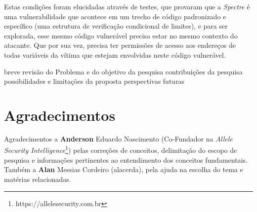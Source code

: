 \documentclass[
	article,			    %
	12pt,				    %
	oneside,			    %
	a4paper,			    %
	chapter=TITLE,		    %
	section=TITLE,		    %
	subsection=TITLE,	    %
	english,			    %
	brazil,				    %
	sumario=tradicional
]{abntex2}
\begin{document}
Estas condições foram elucidadas através de testes, que provaram que a \emph{Spectre} é uma vulnerabilidade que acontece em um trecho de código padronizado e específico (uma estrutura de verificação condicional de limites), e para ser explorada, esse mesmo código vulnerável precisa estar no mesmo contexto do atacante. Que por sua vez, precisa ter permissões de acesso aos endereços de todas variáveis da vítima que estejam envolvidas neste código vulnerável.

breve revisão do Problema e do objetivo da pesquisa
contribuições da pesquisa
possibilidades e limitações da proposta
perspectivas futuras
\postextual

\begin{apendicesenv}
\end{apendicesenv}
\begin{anexosenv}
\vspace{\onelineskip}
\end{anexosenv}
\section*{Agradecimentos}
Agradecimentos a \textbf{Anderson} Eduardo Nascimento (Co-Fundador na \emph{Allele Security Intelligence}\footnote{https://allelesecurity.com.br}) pelas correções de conceitos, delimitação do escopo de pesquisa e informações pertinentes ao entendimento dos conceitos fundamentais. Também a \textbf{Alan} Messias Cordeiro (alacerda), pela ajuda na escolha do tema e matérias relacionadas.
\end{document}
